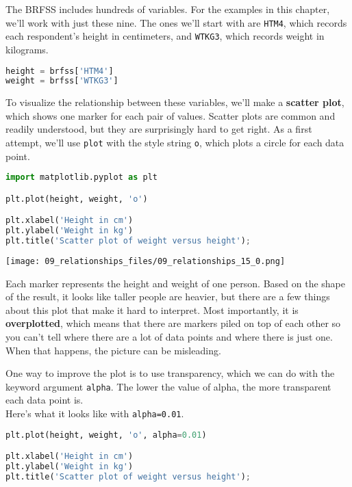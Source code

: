 The BRFSS includes hundreds of variables. For the examples in this
chapter, we'll work with just these nine. The ones we'll start with are
\passthrough{\lstinline!HTM4!}, which records each respondent's height
in centimeters, and \passthrough{\lstinline!WTKG3!}, which records
weight in kilograms.

\begin{lstlisting}[language=Python,style=source]
height = brfss['HTM4']
weight = brfss['WTKG3']
\end{lstlisting}

To visualize the relationship between these variables, we'll make a
\textbf{scatter plot}, which shows one marker for each pair of values.
Scatter plots are common and readily understood, but they are
surprisingly hard to get right. As a first attempt, we'll use
\passthrough{\lstinline!plot!} with the style string
\passthrough{\lstinline!o!}, which plots a circle for each data point.

\begin{lstlisting}[language=Python,style=source]
import matplotlib.pyplot as plt

plt.plot(height, weight, 'o')

plt.xlabel('Height in cm')
plt.ylabel('Weight in kg')
plt.title('Scatter plot of weight versus height');
\end{lstlisting}

\begin{center}
\texttt{[image: 09\_relationships\_files/09\_relationships\_15\_0.png]}
\end{center}

Each marker represents the height and weight of one person. Based on the
shape of the result, it looks like taller people are heavier, but there
are a few things about this plot that make it hard to interpret. Most
importantly, it is \textbf{overplotted}, which means that there are
markers piled on top of each other so you can't tell where there are a
lot of data points and where there is just one. When that happens, the
picture can be misleading.

One way to improve the plot is to use transparency, which we can do with
the keyword argument \passthrough{\lstinline!alpha!}. The lower the
value of alpha, the more transparent each data point is.\\
Here's what it looks like with \passthrough{\lstinline!alpha=0.01!}.

\begin{lstlisting}[language=Python,style=source]
plt.plot(height, weight, 'o', alpha=0.01)

plt.xlabel('Height in cm')
plt.ylabel('Weight in kg')
plt.title('Scatter plot of weight versus height');
\end{lstlisting}


